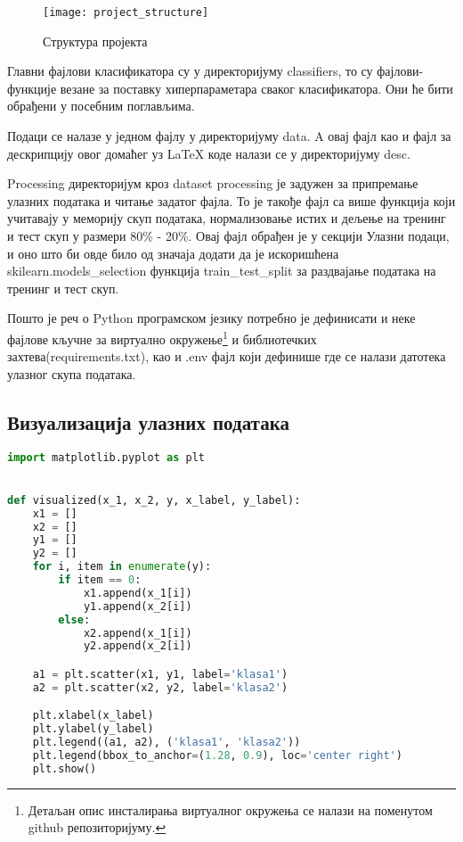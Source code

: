 \documentclass[11pt]{article} %
\begin{document}
\begin{figure}[h]
\centering
	\texttt{[image: project\_structure]} 
	\caption{Структура пројекта} 
\end{figure}

Главни фајлови класификатора су у директоријуму classifiers, то су фајлови-функције везане за поставку хиперпараметара сваког класификатора. Они ће бити обрађени у посебним поглављима.


Подаци се налазе у једном фајлу у директоријуму data. A овај фајл као и фајл за дескрипцију овог домаћег уз LaTeX коде налази се у директоријуму desc. 

Processing директоријум кроз dataset processing је задужен за припремање улазних података и читање задатог фајла. То је такође фајл са више функција који учитавају у меморију скуп података, нормализовање истих и дељење на тренинг и тест скуп у размери 80\% - 20\%. Овај фајл обрађен је у секцији Улазни подаци, и оно што би овде било од значаја додати да је искоришћена skilearn.models\_selection функција train\_test\_split за раздвајање података на тренинг и тест скуп.

Пошто је реч о Python програмском језику потребно је дефинисати и неке фајлове кључне за виртуално окружење\footnote{Детаљан опис инсталирања виртуалног окружења се налази на поменутом github репозиторијуму.} и библиотечких захтева(requirements.txt), као и .env фајл који дефинише где се налази датотека улазног скупа података.
\subsection{Визуализација улазних података}

\begin{lstlisting}[language=Python,title=Пример 2. /visualisation/init.py - `визуализација`]
import matplotlib.pyplot as plt


def visualized(x_1, x_2, y, x_label, y_label):
    x1 = []
    x2 = []
    y1 = []
    y2 = []
    for i, item in enumerate(y):
        if item == 0:
            x1.append(x_1[i])
            y1.append(x_2[i])
        else:
            x2.append(x_1[i])
            y2.append(x_2[i])

    a1 = plt.scatter(x1, y1, label='klasa1')
    a2 = plt.scatter(x2, y2, label='klasa2')

    plt.xlabel(x_label)
    plt.ylabel(y_label)
    plt.legend((a1, a2), ('klasa1', 'klasa2'))
    plt.legend(bbox_to_anchor=(1.28, 0.9), loc='center right')
    plt.show()

\end{lstlisting}
\end{document}
